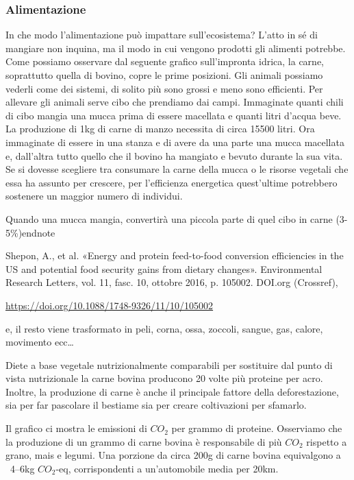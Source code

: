\documentclass[12pt]{book} %
\begin{document}
\clearpage
\subsubsection{Alimentazione}

In che modo l'alimentazione può impattare sull'ecosistema? L'atto in sé di mangiare non inquina, ma il modo in cui vengono prodotti gli alimenti potrebbe. Come possiamo osservare dal seguente grafico sull'impronta idrica, la carne, soprattutto quella di bovino, copre le prime posizioni. Gli animali possiamo vederli come dei sistemi, di solito più sono grossi e meno sono efficienti. Per allevare gli animali serve cibo che prendiamo dai campi. Immaginate quanti chili di cibo mangia una mucca prima di essere macellata e quanti litri d'acqua beve. La produzione di 1kg di carne di manzo necessita di circa 15500 litri. Ora immaginate di essere in una stanza e di avere da una parte una mucca macellata e, dall'altra tutto quello che il bovino ha mangiato e bevuto durante la sua vita.
Se si dovesse scegliere tra consumare la carne della mucca o le risorse vegetali che essa ha assunto per crescere, per l'efficienza energetica quest'ultime potrebbero sostenere un maggior numero di individui.

Quando una mucca mangia, convertirà una piccola parte di quel cibo in carne (3-5\%)endnote{Shepon, A., et al. «Energy and protein feed-to-food conversion efficiencies in the US and potential food security gains from dietary changes». Environmental Research Letters, vol. 11, fasc. 10, ottobre 2016, p. 105002. DOI.org (Crossref), \raggedright\url{https://doi.org/10.1088/1748-9326/11/10/105002}} e, il resto viene trasformato in peli, corna, ossa, zoccoli, sangue, gas, calore, movimento ecc…

Diete a base vegetale nutrizionalmente comparabili per sostituire dal punto di vista nutrizionale la carne bovina producono 20 volte più proteine per acro.
Inoltre, la produzione di carne è anche il principale fattore della deforestazione, sia per far pascolare il bestiame sia per creare coltivazioni per sfamarlo.

Il grafico ci mostra le emissioni di $CO_2$ per grammo di proteine. Osserviamo che la produzione di un grammo di carne bovina è responsabile di più $CO_2$ rispetto a grano, mais e legumi. Una porzione da circa 200g di carne bovina equivalgono a ~4–6kg $CO_2$-eq, corrispondenti a un’automobile media per 20km.
\end{document}

